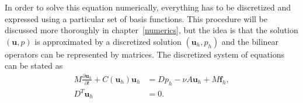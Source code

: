 In order to solve this equation numerically, everything has to be discretized and expressed 
using a particular set of basis functions. This procedure will be discussed more thoroughly
in chapter~\ref{numerics}, but the idea is that the solution $(\mathbf{u},p)$ is approximated 
by a discretized solution $(\mathbf{u}_h,p_h)$ and the bilinear operators can be represented 
by matrices. The discretized system of equations can be stated as
%
\begin{align}
    M\frac{\partial \mathbf{u}_h}{\partial t} +C(\mathbf{u}_h)\mathbf{u}_h 
    &= Dp_h-\nu A\mathbf{u}_h +M\mathbf{f}_h,\\
    D^T\mathbf{u}_h &= 0.
    \label{eq:NSMatrixform}
\end{align}
%




